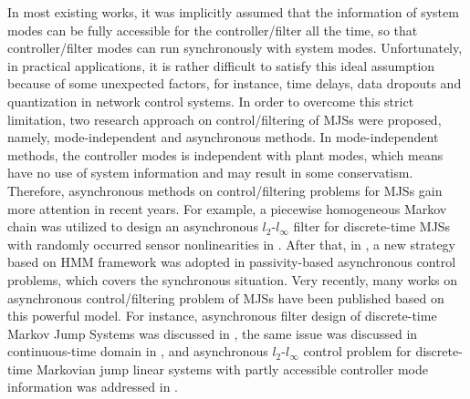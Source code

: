 \documentclass[conference]{IEEEtran}
\begin{document}
%	
	In most existing works, it was  implicitly assumed that the information of system modes can be fully accessible for the controller/filter all the time, so that controller/filter modes can run synchronously with system modes. Unfortunately, in practical applications, it is rather difficult to satisfy this ideal assumption because of some unexpected factors, for instance, time delays, data dropouts and quantization in network control systems. In order to overcome this strict limitation, two research approach on control/filtering of MJSs were proposed, namely, mode-independent and asynchronous methods. In mode-independent methods\cite{mode_independent_T}\cite{mode_independent_wuhuaining}, the controller modes is independent with plant modes, which means have no use of system information and may result in some conservatism. Therefore, asynchronous methods on control/filtering problems for MJSs gain more attention in recent years. For example,  a piecewise homogeneous Markov chain was utilized to design an asynchronous $l_2$-$l_\infty$ filter for discrete-time MJSs with randomly occurred sensor nonlinearities in \cite{l2_filter_wu}. After that, in \cite{passive_wu}, a new strategy based on HMM framework was adopted in passivity-based asynchronous control problems, which covers the synchronous situation. Very recently, many works on asynchronous control/filtering problem of MJSs have been published based on this powerful model. For instance, asynchronous filter design of discrete-time Markov Jump Systems was discussed in \cite{filter_shenying}\cite{filter_zhangmeng}, the same issue was discussed in continuous-time domain in \cite{continus_filter_dongshanling}, and asynchronous $l_2$-$l_{\infty}$ control problem for discrete-time Markovian jump linear systems with partly accessible controller mode information was addressed in \cite{unknown_asynchronous_control}. 
\end{document}
